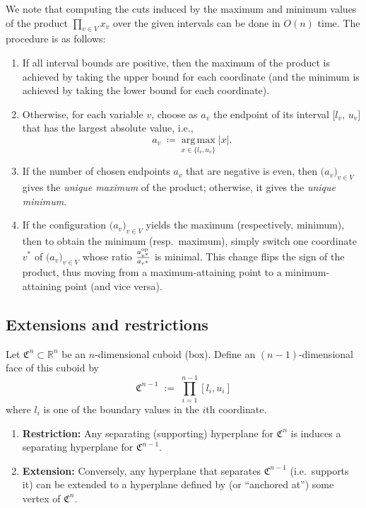 \documentclass{article}
\begin{document}
We note that computing the cuts induced by the maximum and minimum values of the product 
$\prod_{v\in V} x_v$ over the given intervals can be done in $O(n)$ time.
The procedure is as follows:
\begin{enumerate}
\item 
If all interval bounds are positive, then the maximum of the product is achieved by taking the upper bound 
for each coordinate (and the minimum is achieved by taking the lower bound for each coordinate).
\item 
Otherwise, for each variable $v$, choose as $a_v$ the endpoint of its interval $\bigl[l_v,\,u_v\bigr]$ 
that has the largest absolute value, i.e.,
\[
a_v \;\coloneqq\; \underset{x\in\{l_v,u_v\}}{\mathrm{arg\,max}}\;\bigl|x\bigr|.
\]
\item 
If the number of chosen endpoints $a_v$ that are negative is even, 
then $\bigl(a_v\bigr)_{v\in V}$ gives the \emph{unique maximum} of the product; 
otherwise, it gives the \emph{unique minimum}.
\item 
If the configuration $\bigl(a_v\bigr)_{v\in V}$ yields the maximum (respectively, minimum), 
then to obtain the minimum (resp.\ maximum), simply switch one coordinate $v^*$ of $\bigl(a_v\bigr)_{v\in V}$ 
whose ratio $\tfrac{a^{\text{op}}_{v^*}}{a_{v^*}}$ is minimal. 
This change flips the sign of the product, 
thus moving from a maximum‐attaining point to a minimum‐attaining point (and vice versa).
\end{enumerate}

\subsection{Extensions and restrictions}

Let $\mathfrak{C}^n \subset \mathbb{R}^n$ be an $n$-dimensional cuboid (box). 
Define an $(n-1)$-dimensional face of this cuboid by
\[
\mathfrak{C}^{n-1} \;:=\; \prod_{i=1}^{n-1}[l_i,u_i]
\]
where $l_i$ is one of the boundary values in the $i$th coordinate.

\begin{enumerate}
\item \textbf{Restriction:} Any separating (supporting) hyperplane for $\mathfrak{C}^n$ 
is induces a separating hyperplane for $\mathfrak{C}^{n-1}$.

\item \textbf{Extension:} Conversely, any hyperplane that separates 
$\mathfrak{C}^{n-1}$ (i.e.\ supports it) 
can be extended to a hyperplane defined by (or ``anchored at'') 
some vertex of $\mathfrak{C}^n$.
\end{enumerate}
\end{document}
